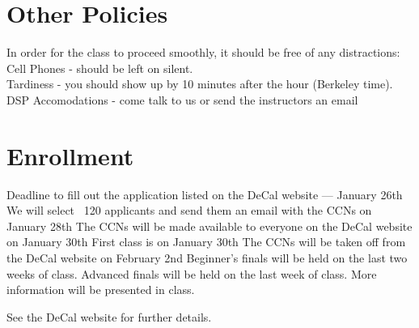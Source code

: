 \documentclass[11pt]{article}
\begin{document}
\section*{Other Policies}
In order for the class to proceed smoothly, it should be free of any distractions: \\
Cell Phones - should be left on silent.\\
Tardiness - you should show up by 10 minutes after the hour (Berkeley time).\\
DSP Accomodations - come talk to us or send the instructors an email

\section*{Enrollment}
Deadline to fill out the application listed on the DeCal website — January 26th
We will select ~120 applicants and send them an email with the CCNs on January 28th
The CCNs will be made available to everyone on the DeCal website on January 30th
First class is on January 30th
The CCNs will be taken off from the DeCal website on February 2nd
Beginner’s finals will be held on the last two weeks of class. Advanced finals will be held on the last week of class. More information will be presented in class.

See the DeCal website for further details.
\end{document}
